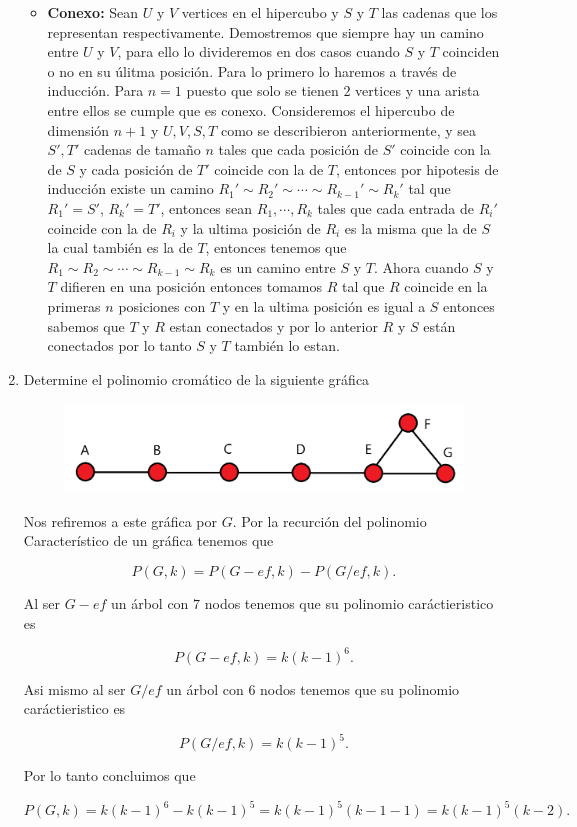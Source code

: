 \documentclass[letterpaper]{article}
\newcommand{\1}{\mathbbm{1}}
\begin{document}
\begin{enumerate}
\begin{itemize}
			\item \textbf{Conexo:} Sean $U$ y $V$ vertices en el hipercubo y $S$ y $T$ las cadenas que los representan respectivamente. Demostremos que siempre hay un camino entre $U$ y $V$, para ello lo divideremos en dos casos cuando $S$ y $T$ coinciden o no en su úlitma posición. Para lo primero lo haremos a través de inducción. Para $n = 1$ puesto que solo se tienen $2$ vertices y una arista entre ellos se cumple que es conexo. Consideremos el hipercubo de dimensión $n+1$ y $U,V,S,T$ como se describieron anteriormente, y sea $S',T'$ cadenas de tamaño $n$ tales que cada posición de $S'$ coincide con la de $S$ y cada posición de $T'$ coincide con la de $T$, entonces por hipotesis de inducción existe un camino $R_1'\sim R_2' \sim \cdots \sim R_{k-1}' \sim R_k'$ tal que $R_1' = S'$, $R_k' = T'$, entonces sean $R_1,\cdots, R_k$ tales que cada entrada de $R_i'$ coincide con la de $R_i$ y la ultima posición de $R_i$ es la misma que la de $S$ la cual también es la de $T$, entonces tenemos que $R_1 \sim R_2 \sim \cdots \sim R_{k-1} \sim R_k$ es un camino entre $S$ y $T$. Ahora cuando $S$ y $T$ difieren en una posición entonces tomamos $R$ tal que $R$ coincide en la primeras $n$ posiciones con $T$ y en la ultima posición es igual a $S$ entonces sabemos que $T$ y $R$ estan conectados y por lo anterior $R$ y $S$ están conectados por lo tanto $S$ y $T$ también lo estan.
		\end{itemize}

		\item Determine el polinomio cromático de la siguiente gráfica
		
		\begin{figure}[H]
			\centering
			\includegraphics[scale = 0.5]{Images/graph.png}
		\end{figure}

		Nos refiremos a este gráfica por $G$. Por la recurción del polinomio Característico de un gráfica tenemos que

		\[P(G,k) = P(G-ef,k) - P(G/ef,k).\]

		Al ser $G-ef$ un árbol con $7$ nodos tenemos que su polinomio caráctieristico es

		\[P(G-ef,k) = k(k-1)^{6}.\]

		Asi mismo al ser $G/ef$ un árbol con $6$ nodos tenemos que su polinomio caráctieristico es

		\[P(G/ef,k) = k(k-1)^{5}.\]

		Por lo tanto concluimos que

		\[P(G,k) = k(k-1)^6 - k(k-1)^5 = k(k-1)^5(k-1-1) = k(k-1)^5(k-2).\]

    \end{enumerate}

	
\end{document}
